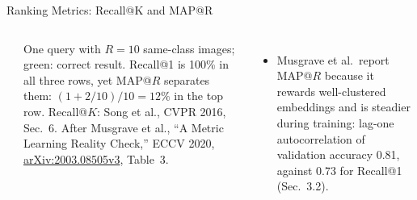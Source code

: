 \begin{frame}{Ranking Metrics: Recall@K and MAP@R}
\begin{columns}[T,onlytextwidth]
\\[0.4em]
      {\scriptsize One query with $R=10$ same-class images; green: correct result. Recall@1 is 100\% in all three rows, yet MAP@$R$ separates them: $(1+2/10)/10=12\%$ in the top row. Recall@$K$: Song et al., CVPR 2016, Sec.~6. After Musgrave et al., ``A Metric Learning Reality Check,'' ECCV 2020, \href{https://arxiv.org/abs/2003.08505v3}{arXiv:2003.08505v3}, Table~3.\par}
      \begin{itemize}\scriptsize\itemsep0.2em
        \item Musgrave et al.\ report MAP@$R$ because it rewards well-clustered embeddings and is steadier during training: lag-one autocorrelation of validation accuracy 0.81, against 0.73 for Recall@1 (Sec.~3.2).
      \end{itemize}
  \end{columns}
\end{frame}

